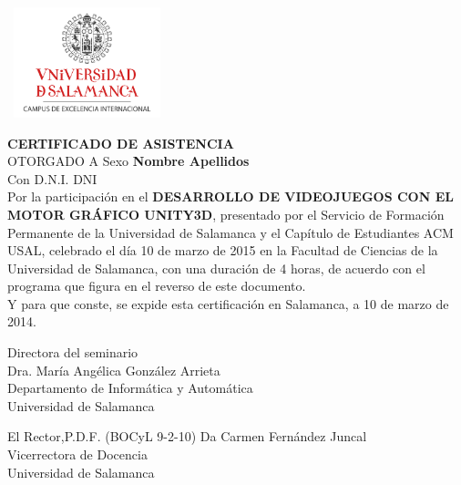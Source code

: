 \documentclass[spanish]{article}
\begin{document}
\hbox{
	\includegraphics[height=3.2cm]{usallogo}
	\hspace{14.2cm}
}
\vspace{0.5cm}
\begin{center}

{\LARGE \textbf{CERTIFICADO DE ASISTENCIA}\\[0.5cm]}
{\Large OTORGADO A {{Sexo}}\textbf{ {{Nombre}} {{Apellidos}} }\\[0.2cm]}
{Con D.N.I. {{DNI}}\\[0.3cm]}
{\large Por la participación en el \textbf{DESARROLLO DE VIDEOJUEGOS CON EL MOTOR GRÁFICO UNITY3D}, presentado por el Servicio de Formación Permanente de la Universidad de Salamanca y el Capítulo de Estudiantes ACM USAL, celebrado el día 10 de marzo de 2015 en la Facultad de Ciencias de la Universidad de Salamanca, con una duración de 4 horas, de acuerdo con el programa que figura en el reverso de este documento.\\[0.5cm]
Y para que conste, se expide esta certificación en Salamanca, a 10 de marzo de 2014.\\}

\vspace*{2cm}

\parbox{0.9\textwidth}{
	\parbox{7cm}{
		\centering
		Directora del seminario\\
		\vspace*{2cm}
		Dra. María Angélica González Arrieta\\
		Departamento de Informática y Automática\\
		Universidad de Salamanca
	}
	\hfill
	\parbox{7cm}{
		\centering
		El Rector,P.D.F. (BOCyL 9-2-10)
		\vspace*{2cm}
		Da Carmen Fernández Juncal\\
		Vicerrectora de Docencia\\
		Universidad de Salamanca
	}
}
\end{center}
\newpage
\end{document}
